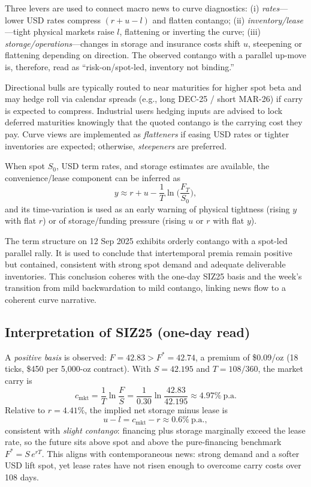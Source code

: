 \documentclass[11pt,a4paper]{article} %
\begin{document}
Three levers are used to connect macro news to curve diagnostics: (i) \emph{rates}—lower USD rates compress \((r+u-l)\) and flatten contango; (ii) \emph{inventory/lease}—tight physical markets raise \(l\), flattening or inverting the curve; (iii) \emph{storage/operations}—changes in storage and insurance costs shift \(u\), steepening or flattening depending on direction. The observed contango with a parallel up-move is, therefore, read as “risk-on/spot-led, inventory not binding.”


Directional bulls are typically routed to near maturities for higher spot beta and may hedge roll via calendar spreads (e.g., long DEC-25 / short MAR-26) if carry is expected to compress. Industrial users hedging inputs are advised to lock deferred maturities knowingly that the quoted contango is the carrying cost they pay. Curve views are implemented as \emph{flatteners} if easing USD rates or tighter inventories are expected; otherwise, \emph{steepeners} are preferred.


When spot \(S_0\), USD term rates, and storage estimates are available, the convenience/lease component can be inferred as
\[
y \approx r + u - \frac{1}{T} \ln\!\Big(\frac{F_T}{S_0}\Big),
\]
and its time-variation is used as an early warning of physical tightness (rising \(y\) with flat \(r\)) or of storage/funding pressure (rising \(u\) or \(r\) with flat \(y\)).

\medskip
The term structure on 12 Sep 2025 exhibits orderly contango with a spot-led parallel rally. It is used to conclude that intertemporal premia remain positive but contained, consistent with strong spot demand and adequate deliverable inventories. This conclusion coheres with the one-day SIZ25 basis and the week's transition from mild backwardation to mild contango, linking news flow to a coherent curve narrative.


\subsection{Interpretation of \texorpdfstring{SIZ25}{SIZ25} (one-day read)}
A \emph{positive basis} is observed: \(F=42.83>F^{*}=42.74\), a premium of \$0.09/oz (18 ticks, \$450 per 5{,}000-oz contract). With \(S=42.195\) and \(T=108/360\), the market carry is
\[
c_{\mathrm{mkt}}=\frac{1}{T}\ln\!\frac{F}{S}
=\frac{1}{0.30}\ln\!\frac{42.83}{42.195}\approx 4.97\%\ \text{p.a.}
\]
Relative to \(r=4.41\%\), the implied net storage minus lease is
\[
u-l=c_{\mathrm{mkt}}-r\approx 0.6\%\ \text{p.a.},
\]
consistent with \emph{slight contango}: financing plus storage marginally exceed the lease rate, so the future sits above spot and above the pure-financing benchmark \(F^{*}=S\,e^{rT}\). This aligns with contemporaneous news: strong demand and a softer USD lift spot, yet lease rates have not risen enough to overcome carry costs over 108 days.
\end{document}
